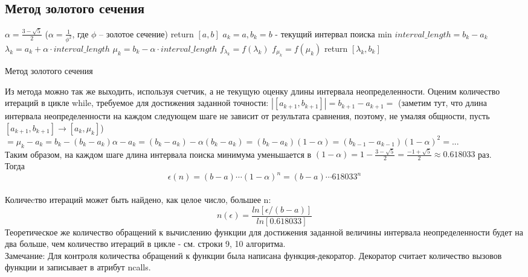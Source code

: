 \documentclass[main.tex]{subfiles}
\begin{document}
	\subsection{Метод золотого сечения}
	\begin{algorithm}[H]\label{golden_ratio}
		
		
		$\alpha = \frac{3-\sqrt{5}}{2}$ ($\alpha = \frac{1}{\phi^2}$, где $\phi$ -- золотое сечение)\;
		 {return $[a, b]$}
		$a_k = a, b_k = b$ - текущий интервал поиска min\;
		$interval\_length = b_k - a_k$\;
		$\lambda_k = a_k + \alpha\cdot interval\_length$\;
		$\mu_k = b_k - \alpha\cdot interval\_length$\;
		$f_{\lambda_k} = f(\lambda_k)$\;
		$f_{\mu_k} = f(\mu_k)$\;
		return $[\lambda_k, b_k]$\;		
		\caption{Метод золотого сечения}
	\end{algorithm}\newpage
	Из метода можно так же выходить, используя счетчик, а не текущую оценку длины интервала неопределенности. Оценим количество итераций в цикле while, требуемое для достижения заданной точности: $|[a_{k+1}, b_{k+1}]| = b_{k+1} - a_{k+1} = $ (заметим тут, что длина интервала неопределенности на каждом следующем шаге не зависит от результата сравнения, поэтому, не умаляя общности, пусть $[a_{k+1}, b_{k+1}] \rightarrow [a_k, \mu_k]$) $ = \mu_k - a_k = b_k - (b_k - a_k)\alpha - a_k = (b_k - a_k) - \alpha(b_k - a_k) = (b_k - a_k)(1 - \alpha) = (b_{k-1} - a_{k-1})(1 - \alpha)^2 = ...$\\
	Таким образом, на каждом шаге длина интервала поиска минимума уменьшается в \newline $(1 - \alpha) = 1 -  \frac{3-\sqrt{5}}{2} = \frac{-1 +\sqrt{5}}{2} \approx 0.618033$ раз.\\
	Тогда $$\epsilon(n) = (b - a)\cdots(1 - \alpha)^n = (b - a)\cdots 618033^n$$\\
	Количеcтво итераций может быть найдено, как целое  число, большее n:$$n(\epsilon) = \frac{ln[\epsilon/(b-a)]}{ln[0.618033]}$$
	Теоретическое же количество обращений к вычислению функции для достижения заданной величины интервала неопределенности будет на два больше, чем количество итераций в цикле - см. строки 9, 10 алгоритма.\\
	Замечание: Для контроля количества обращений к функции была написана функция-декоратор. Декоратор считает количество вызовов функции и записывает в атрибут ncalls.
	
\end{document}
